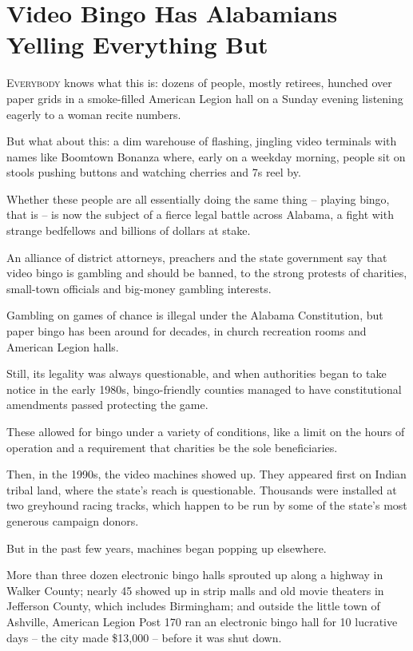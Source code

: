 ﻿\documentclass[12pt]{article}
\begin{document}
\section{Video Bingo Has Alabamians Yelling Everything But}

\lettrine{E}{verybody} knows what this is: dozens of people, mostly
retirees, hunched over paper grids in a smoke-filled American Legion hall on a Sunday evening
listening eagerly to a woman recite numbers.

But what about this: a dim warehouse of flashing, jingling video terminals with names like Boomtown
Bonanza where, early on a weekday morning, people sit on stools pushing buttons and watching
cherries and 7s reel by.

Whether these people are all essentially doing the same thing -- playing bingo, that is -- is now
the subject of a fierce legal battle across Alabama, a fight with strange bedfellows and billions of
dollars at stake.

An alliance of district attorneys, preachers and the state government say that video bingo is
gambling and should be banned, to the strong protests of charities, small-town officials and
big-money gambling interests.

Gambling on games of chance is illegal under the Alabama Constitution, but paper bingo has been
around for decades, in church recreation rooms and American Legion halls.

Still, its legality was always questionable, and when authorities began to take notice in the early
1980s, bingo-friendly counties managed to have constitutional amendments passed protecting the game.

These allowed for bingo under a variety of conditions, like a limit on the hours of operation and a
requirement that charities be the sole beneficiaries.

Then, in the 1990s, the video machines showed up. They appeared first on Indian tribal land, where
the state's reach is questionable. Thousands were installed at two greyhound racing tracks, which
happen to be run by some of the state's most generous campaign donors.

But in the past few years, machines began popping up elsewhere.

More than three dozen electronic bingo halls sprouted up along a highway in Walker County; nearly 45
showed up in strip malls and old movie theaters in Jefferson County, which includes Birmingham; and
outside the little town of Ashville, American Legion Post 170 ran an electronic bingo hall for 10
lucrative days -- the city made \$13,000 -- before it was shut down.
\end{document}
